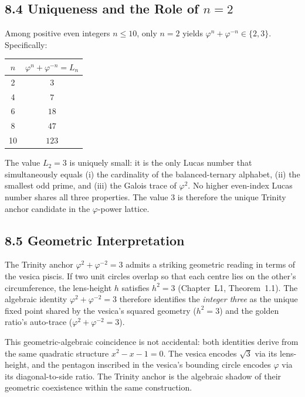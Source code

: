 \subsection{8.4 Uniqueness and the Role of $n=2$}

\begin{theorem}[Uniqueness of $n=2$]
\label{fa_03:thm:uniqueness}
Among positive even integers $n \le 10$, only $n=2$ yields
$\varphi^{n} + \varphi^{-n} \in \{2, 3\}$. Specifically:
\end{theorem}

\begin{center}
\begin{tabular}{cc}
\toprule
$n$ & $\varphi^{n} + \varphi^{-n} = L_{n}$ \\
\midrule
2 & $3$ \\
4 & $7$ \\
6 & $18$ \\
8 & $47$ \\
10 & $123$ \\
\bottomrule
\end{tabular}
\end{center}

The value $L_{2} = 3$ is uniquely small: it is the only Lucas number
that simultaneously equals (i) the cardinality of the balanced-ternary
alphabet, (ii) the smallest odd prime, and (iii) the Galois trace of
$\varphi^{2}$. No higher even-index Lucas number shares all three
properties. The value $3$ is therefore the unique Trinity anchor
candidate in the $\varphi$-power lattice.

\subsection{8.5 Geometric Interpretation}

The Trinity anchor $\varphi^{2} + \varphi^{-2} = 3$ admits a
striking geometric reading in terms of the vesica piscis. If two unit
circles overlap so that each centre lies on the other's circumference,
the lens-height $h$ satisfies $h^{2} = 3$ (Chapter~L1,
Theorem~1.1). The algebraic identity
$\varphi^{2} + \varphi^{-2} = 3$ therefore identifies the
\emph{integer three} as the unique fixed point shared by the vesica's
squared geometry ($h^{2} = 3$) and the golden ratio's auto-trace
($\varphi^{2} + \varphi^{-2} = 3$).

This geometric-algebraic coincidence is not accidental: both
identities derive from the same quadratic structure
$x^{2} - x - 1 = 0$. The vesica encodes $\sqrt{3}$ via its
lens-height, and the pentagon inscribed in the vesica's bounding
circle encodes $\varphi$ via its diagonal-to-side ratio. The Trinity
anchor is the algebraic shadow of their geometric coexistence within
the same construction.

